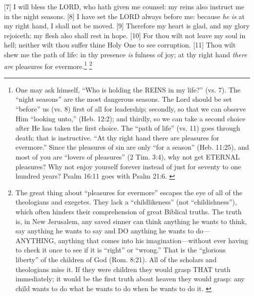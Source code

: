 [7] \textcolor[cmyk]{0.99998,1,0,0}{I will bless the LORD, who hath given me counsel: my reins also instruct me in the night seasons.}
[8] \textcolor[cmyk]{0.99998,1,0,0}{I have set the LORD always before me: because \emph{he} \emph{is} at my right hand, I shall not be moved.}
[9] \textcolor[cmyk]{0.99998,1,0,0}{Therefore my heart is glad, and my glory rejoiceth: my flesh also shall rest in hope.}
[10] \textcolor[cmyk]{0.99998,1,0,0}{For thou wilt not leave my soul in hell; neither wilt thou suffer thine Holy One to see corruption.}
[11] \textcolor[cmyk]{0.99998,1,0,0}{Thou wilt shew me the path of life: in thy presence \emph{is} fulness of joy; at thy right hand \emph{there} \emph{are} pleasures for evermore.}\footnote{One may ask himself, “Who is holding the REINS in my life?” (vs. 7). The “night seasons” are the most dangerous seasons. The Lord should be set “before” us (vs. 8) first of all for leadership; secondly, so that we can observe Him “looking unto,” (Heb. 12:2); and thirdly, so we can take a second choice after He has taken the first choice. The “path of life” (vs. 11) goes through death; that is instructive. “At thy right hand there are pleasures for evermore.” Since the pleasures of sin are only “for a season” (Heb. 11:25), and most of you are “lovers of pleasures” (2 Tim. 3:4), why not get ETERNAL pleasures? Why not enjoy yourself forever instead of just for seventy to one hundred years? Psalm 16:11 goes with Psalm 21:6. \cite{Ruckman1992Psalms} } \footnote{The great thing about ``pleasures for evermore'' escapes the eye of all of the theologians and exegetes. They lack a ``childlikeness'' (not ``childishness''), which often hinders their comprehension of great Biblical truths. The truth is, in New Jerusalem, any saved sinner can think anything he wants to think, say anything he wants to say and DO anything he wants to do—ANYTHING, anything that comes into his imagination—without ever having to check it once to see if it is “right” or “wrong.” That is the “glorious liberty” of the children of God (Rom. 8:21). All of the scholars and theologians miss it. If they were children they would grasp THAT truth immediately; it would be the first truth about heaven they would grasp: any child wants to do what he wants to do when he wants to do it. \cite{Ruckman1992Psalms} }





